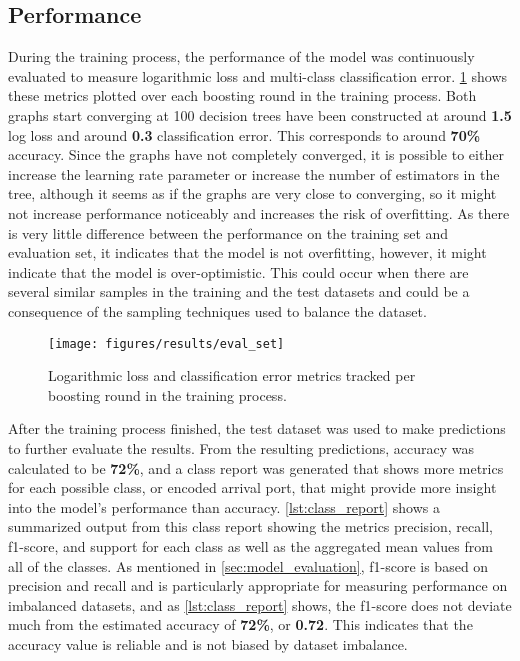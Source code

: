 \subsection{Performance}

During the training process, the performance of the model was continuously evaluated to measure logarithmic loss and multi-class classification error. \cref{fig:eval_set} shows these metrics plotted over each boosting round in the training process. Both graphs start converging at 100 decision trees have been constructed at around \textbf{1.5} log loss and around \textbf{0.3} classification error. This corresponds to around \textbf{70\%} accuracy. Since the graphs have not completely converged, it is possible to either increase the learning rate parameter or increase the number of estimators in the tree, although it seems as if the graphs are very close to converging, so it might not increase performance noticeably and increases the risk of overfitting. As there is very little difference between the performance on the training set and evaluation set, it indicates that the model is not overfitting, however, it might indicate that the model is over-optimistic. This could occur when there are several similar samples in the training and the test datasets and could be a consequence of the sampling techniques used to balance the dataset.

\begin{figure}[htbp]
    \centering
    \texttt{[image: figures/results/eval\_set]}
    \caption{Logarithmic loss and classification error metrics tracked per boosting round in the training process.}
    \label{fig:eval_set}
\end{figure}

After the training process finished, the test dataset was used to make predictions to further evaluate the results. From the resulting predictions, accuracy was calculated to be \textbf{72\%}, and a class report was generated that shows more metrics for each possible class, or encoded arrival port, that might provide more insight into the model's performance than accuracy. \cref{lst:class_report} shows a summarized output from this class report showing the metrics precision, recall, f1-score, and support for each class as well as the aggregated mean values from all of the classes. As mentioned in \cref{sec:model_evaluation}, f1-score is based on precision and recall and is particularly appropriate for measuring performance on imbalanced datasets, and as \cref{lst:class_report} shows, the f1-score does not deviate much from the estimated accuracy of \textbf{72\%}, or \textbf{0.72}. This indicates that the accuracy value is reliable and is not biased by dataset imbalance.

